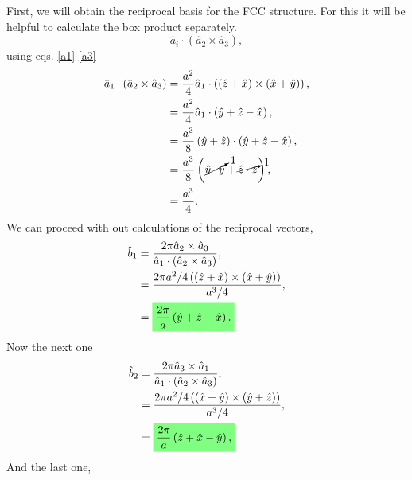 \begin{questions}
\begin{solution}
  First, we will obtain the reciprocal basis for the FCC structure. For this it will be helpful to calculate the box product separately.
  \begin{equation*}
    \hat{a}_i \cdot (\hat{a}_2\times\hat{a}_3),
  \end{equation*}
  using eqs. \ref{a1}-\ref{a3}
  \begin{equation}
    \begin{aligned}[b]
      \hat{a}_1 \cdot (\hat{a}_2\times\hat{a}_3) &= \frac{a^2}{4}\hat{a}_1 \cdot \left(\left(\hat{z} + \hat{x}\right)\times\left(\hat{x} + \hat{y}\right)\right),\\
       &= \frac{a^2}{4}\hat{a}_1 \cdot \left(\hat{y} + \hat{z} - \hat{x} \right),\\
       &= \frac{a^3}{8}\left(\hat{y} + \hat{z} \right)\cdot \left(\hat{y} + \hat{z} - \hat{x} \right), \\
       &= \frac{a^3}{8}\left(\cancelto{1}{\hat{y}\cdot\hat{y}} + \cancelto{1}{\hat{z}\cdot\hat{z}} \right),\\
       &= \frac{a^3}{4}.
       \label{vol}
    \end{aligned}
  \end{equation}
  We can proceed with out calculations of the reciprocal vectors,
  \begin{equation}
    \begin{aligned}[b]
      \hat{b}_1 &= \frac{2\pi\hat{a}_2\times\hat{a}_3}{\hat{a}_1 \cdot (\hat{a}_2\times\hat{a}_3)},\\
      &= \frac{2\pi a^2/4 \left(\left(\hat{z} + \hat{x}\right)\times\left(\hat{x} + \hat{y}\right)\right)}{a^3/4},\\
      &= \hlgreen{\frac{2\pi}{a} \left(\hat{y} + \hat{z} - \hat{x} \right).}
      \label{b1}
    \end{aligned}
  \end{equation}
  Now the next one
  \begin{equation}
    \begin{aligned}[b]
      \hat{b}_2 &= \frac{2\pi\hat{a}_3\times\hat{a}_1}{\hat{a}_1 \cdot (\hat{a}_2\times\hat{a}_3)},\\
      &= \frac{2\pi a^2/4 \left(\left(\hat{x} + \hat{y}\right)\times\left(\hat{y} + \hat{z}\right)\right)}{a^3/4},\\
      &= \hlgreen{\frac{2\pi}{a} \left(\hat{z} + \hat{x} - \hat{y} \right),}
      \label{b2}
    \end{aligned}
  \end{equation}
  And the last one,

\end{solution}
\end{questions}
